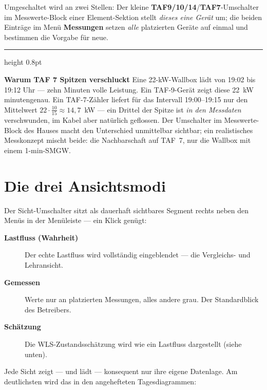 \documentclass[11pt,a4paper,parskip=half]{scrreprt}
\newcommand{\ui}[1]{\textsf{\bfseries #1}}          %
\newenvironment{beispiel}[1][Beispiel]
  {\par\medskip
   {\color{bsp}\hrule height 0.8pt}\nopagebreak\smallskip
   \noindent\textbf{\textsf{\textcolor{bsp}{#1}}}\quad\ignorespaces}
  {\par\nopagebreak\smallskip{\color{bsp}\hrule height 0.8pt}\par\medskip}
\begin{document}
Umgeschaltet wird an zwei Stellen: Der kleine
\ui{TAF9/10/14}/\ui{TAF7}-Umschalter im Messwerte-Block einer
Element-Sektion stellt \emph{dieses eine Gerät} um; die beiden
Einträge im Menü \ui{Messungen} setzen \emph{alle} platzierten
Geräte auf einmal und bestimmen die Vorgabe für neue.

\begin{beispiel}[Warum TAF 7 Spitzen verschluckt]
Eine 22-kW-Wallbox lädt von 19:02 bis 19:12 Uhr --- zehn Minuten
volle Leistung. Ein TAF-9-Gerät zeigt diese 22~kW minutengenau. Ein
TAF-7-Zähler liefert für das Intervall 19:00--19:15 nur den
Mittelwert $22 \cdot \tfrac{10}{15} \approx 14{,}7$~kW --- ein
Drittel der Spitze ist \emph{in den Messdaten} verschwunden, im
Kabel aber natürlich geflossen. Der Umschalter im Messwerte-Block
des Hauses macht den Unterschied unmittelbar sichtbar; ein
realistisches Messkonzept mischt beide: die Nachbarschaft auf TAF~7,
nur die Wallbox mit einem 1-min-SMGW.
\end{beispiel}

\section{Die drei Ansichtsmodi}
\label{sec:sichten}

Der Sicht-Umschalter sitzt als dauerhaft sichtbares Segment rechts
neben den Menüs in der Menüleiste --- ein Klick genügt:

\begin{description}
  \item[\ui{Lastfluss (Wahrheit)}] Der echte Lastfluss wird
    vollständig eingeblendet --- die Vergleichs- und Lehransicht.
  \item[\ui{Gemessen}] Werte nur an platzierten
    Messungen, alles andere grau. Der Standardblick des Betreibers.
  \item[\ui{Schätzung}] Die WLS-Zustandsschätzung wird wie ein
    Lastfluss dargestellt (siehe unten).
\end{description}

Jede Sicht zeigt --- und lädt --- konsequent nur ihre eigene
Datenlage. Am deutlichsten wird das in den angehefteten
Tagesdiagrammen:
\end{document}
